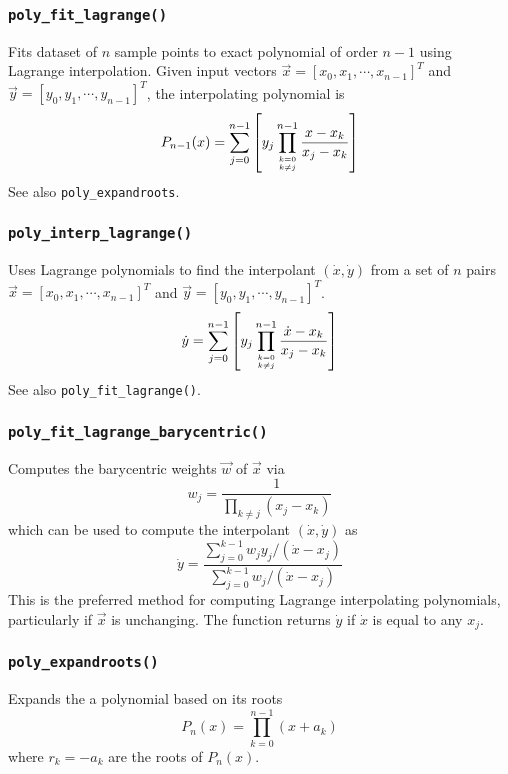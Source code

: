 \subsubsection{{\tt poly\_fit\_lagrange()}}
Fits dataset of $n$ sample points to exact polynomial of order $n-1$ using
Lagrange interpolation.
Given input vectors
$\vec{x}=[x_0,x_1,\cdots,x_{n-1}]^T$ and 
$\vec{y}=[y_0,y_1,\cdots,y_{n-1}]^T$, the interpolating polynomial is
\[
    P_{n-1}(x) =
        \sum_{j=0}^{n-1} {
            \left[
            y_j
            \prod_{{k=0}\atop{k \ne j}}^{n-1} {
                \frac{x-x_k}{x_j-x_k}
            }
            \right]
        }
\]
See also {\tt poly\_expandroots}.

\subsubsection{{\tt poly\_interp\_lagrange()}}
Uses Lagrange polynomials to find the interpolant
$(\dot{x},\dot{y})$ from a set of $n$ pairs
$\vec{x}=[x_0,x_1,\cdots,x_{n-1}]^T$ and 
$\vec{y}=[y_0,y_1,\cdots,y_{n-1}]^T$.
\[
    \dot{y} =
        \sum_{j=0}^{n-1} {
            \left[
            y_j
            \prod_{{k=0}\atop{k \ne j}}^{n-1} {
                \frac{\dot{x}-x_k}{x_j-x_k}
            }
            \right]
        }
\]
See also {\tt poly\_fit\_lagrange()}.

\subsubsection{{\tt poly\_fit\_lagrange\_barycentric()}}
Computes the barycentric weights $\vec{w}$ of $\vec{x}$ via
\[
    w_j =   \frac{1}{
                \prod_{k \ne j}{\left(x_j - x_k\right)}
            }
\]
which can be used to compute the interpolant $(\dot{x},\dot{y})$ as
\[
    \dot{y} =   \frac{
                    \sum\limits_{j=0}^{k-1}{ w_j y_j /(\dot{x}-x_j) }
                } {
                    \sum\limits_{j=0}^{k-1}{     w_j /(\dot{x}-x_j) }
                }
\]
This is the preferred method for computing Lagrange interpolating polynomials,
particularly if $\vec{x}$ is unchanging.
The function returns $\dot{y}$ if $\dot{x}$ is equal to any $x_j$.

\subsubsection{{\tt poly\_expandroots()}}
Expands the a polynomial based on its roots
\[
    P_n(x) = \prod_{k=0}^{n-1}{(x+a_k)}
\]
where $r_k=-a_k$ are the roots of $P_n(x)$.

